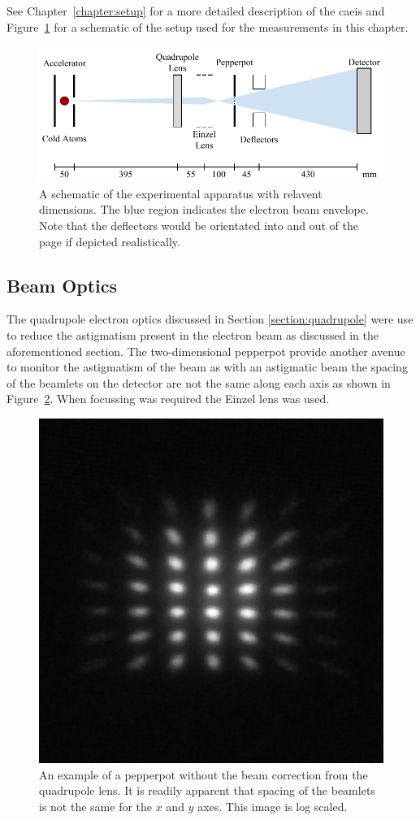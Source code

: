 See Chapter~\ref{chapter:setup} for a more detailed description of the \gls{caeis} and Figure~\ref{figure:emittance_schematic} for a schematic of the setup used for the measurements in this chapter.

\begin{figure}
\center
\includegraphics{part2/Figs/EmittanceApparatusSchematic.pdf}
\caption{A schematic of the experimental apparatus with relavent dimensions. The blue region indicates the electron beam envelope. Note that the deflectors would be orientated into and out of the page if depicted realistically.}
\label{figure:emittance_schematic}
\end{figure}

\subsection{Beam Optics}
The quadrupole electron optics discussed in Section \ref{section:quadrupole} were use to reduce the astigmatism present in the electron beam as discussed in the aforementioned section.
The two-dimensional pepperpot provide another avenue to monitor the astigmatism of the beam as with an astigmatic beam the spacing of the beamlets on the detector are not the same along each axis as shown in Figure~\ref{figure:astigmatic_pepperpot}.
When focussing was required the Einzel lens was used.

\begin{figure}
    \center
    \includegraphics[width=0.5\linewidth]{part2/Figs/example_astigmatic_pepperpot.jpeg}
    \caption{An example of a pepperpot without the beam correction from the quadrupole lens. It is readily apparent that spacing of the beamlets is not the same for the $x$ and $y$ axes. This image is log scaled.}
    \label{figure:astigmatic_pepperpot}
\end{figure}

